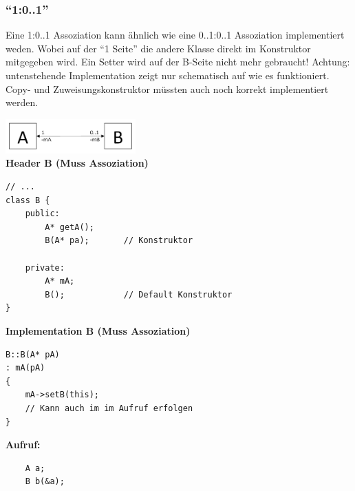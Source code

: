\subsubsection{"`1:0..1"'}
Eine 1:0..1 Assoziation kann ähnlich wie eine 0..1:0..1 Assoziation
implementiert weden. Wobei auf der "`1 Seite"' die andere Klasse direkt im
Konstruktor mitgegeben wird. Ein Setter wird auf der B-Seite nicht mehr
gebraucht! Achtung: untenstehende Implementation zeigt nur schematisch auf wie
es funktioniert. Copy- und Zuweisungskonstruktor müssten auch noch korrekt
implementiert werden.
\begin{multicols}{2}
\includegraphics[width=5cm]{./bilder/Assozi_1_01.png}\\
\textbf{Header B (Muss Assoziation)}
\begin{lstlisting}
// ...
class B {
	public: 
		A* getA();
		B(A* pa);		// Konstruktor
	
	private:
		A* mA;
		B();			// Default Konstruktor
}
\end{lstlisting}
\columnbreak
\textbf{Implementation B (Muss Assoziation)}
\begin{lstlisting}
B::B(A* pA)
: mA(pA)
{
	mA->setB(this); 
	// Kann auch im im Aufruf erfolgen
}
\end{lstlisting}

\textbf{Aufruf:}
\begin{lstlisting}
	A a;
	B b(&a);
\end{lstlisting}
\end{multicols}

\newpage

